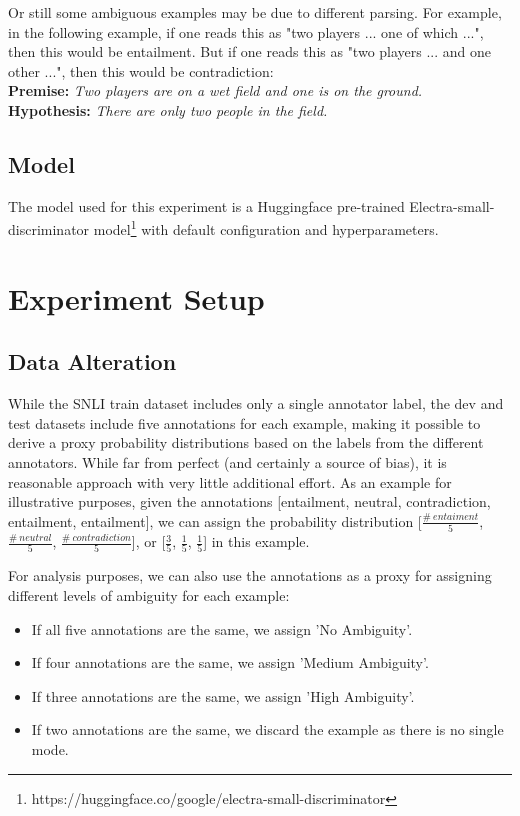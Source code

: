\documentclass[11pt]{article}
\begin{document}
Or still some ambiguous examples may be due to different parsing. For example, in the
following example, if one reads this as "two players ... one of which ...", then this would be entailment.
But if one reads this as "two players ... and one other ...", then this would be contradiction:\\
\textbf{Premise:} \textit{Two players are on a wet field and one is on the ground.}\\
\textbf{Hypothesis:} \textit{There are only two people in the field.}\\

\subsection{Model}

The model used for this experiment is a Huggingface pre-trained Electra-small-discriminator
model\footnote{https://huggingface.co/google/electra-small-discriminator} with default configuration
and hyperparameters.

\section{Experiment Setup}

\subsection{Data Alteration}
While the SNLI train dataset includes only a single annotator label, the dev and test datasets include five annotations
for each example, making it possible to derive a proxy probability distributions based on the labels from the
different annotators. While far from perfect (and certainly a source of bias), it is reasonable approach with
very little additional effort. As an example for illustrative purposes, given the annotations [entailment,
neutral, contradiction, entailment, entailment], we can assign the probability distribution
[$\frac{\#\ entaiment}{5}$, $\frac{\#\ neutral}{5}$, $\frac{\#\ contradiction}{5}$], or
[$\frac{3}{5}$, $\frac{1}{5}$, $\frac{1}{5}$] in this example.

For analysis purposes, we can also use the annotations as a proxy for assigning different levels of ambiguity
for each example:

\begin{itemize}
  \item If all five annotations are the same, we assign 'No Ambiguity'.
  \item If four annotations are the same, we assign 'Medium Ambiguity'.
  \item If three annotations are the same, we assign 'High Ambiguity'.
  \item If two annotations are the same, we discard the example as there is no single mode.
\end{itemize}
\end{document}
